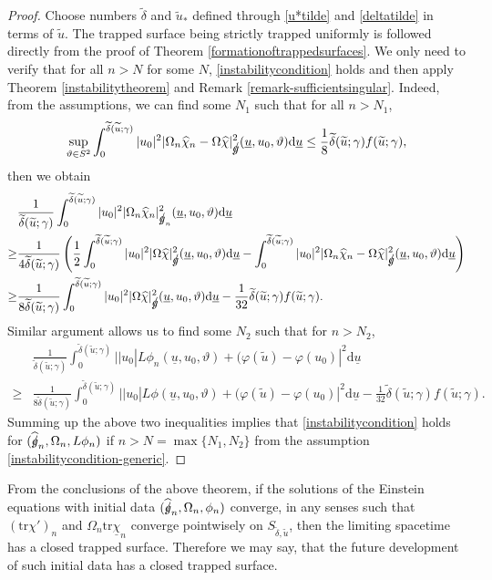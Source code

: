 \documentclass[11pt,reqno]{amsart}
\theoremstyle{definition}
\numberwithin{equation}{section}
\newcommand{\D}{\mathrm{d}}
\newcommand{\tr}{\mathrm{tr}}
\def\chib{\underline{\chi}}
\def\chih{\widehat{\chi}}
\def\tr{\mathrm{tr}}
\def\ub{\underline{u}}
\newcommand{\tdelta}{\widetilde{\delta}}
\newcommand{\tu}{\widetilde{u}}
\def\gs{\mbox{$g \mkern -9mu /$}}
\begin{document}
\begin{proof}
Choose numbers $\tdelta$ and $\tu_*$ defined through \eqref{u*tilde} and \eqref{deltatilde} in terms of $\tu$. The trapped surface being strictly trapped uniformly is followed directly from the proof of Theorem \ref{formationoftrappedsurfaces}. We only need to verify that for all $n>N$ for some $N$, \eqref{instabilitycondition} holds and then apply Theorem \ref{instabilitytheorem} and Remark \ref{remark-sufficientsingular}. Indeed, from the assumptions, we can find some $N_1$ such that for all $n>N_1$,
\begin{align*}
\sup_{\vartheta\in S^2}\int_0^{\tdelta(\tu;\gamma)}|u_0|^2|\Omega_n\chih_n-\Omega\chih|_{\gs}^2(\ub,u_0,\vartheta)\D \ub\le\frac{1}{8}\tdelta(\tu;\gamma)f(\tu;\gamma),
\end{align*}
then we obtain
\begin{align*}
&\frac{1}{\tdelta(\tu;\gamma)}\int_0^{\tdelta(\tu;\gamma)}|u_0|^2|\Omega_n\chih_n|_{\gs_n}^2(\ub,u_0,\vartheta)\D \ub\\
\ge&\frac{1}{4\tdelta(\tu;\gamma)}\left(\frac{1}{2}\int_0^{\tdelta(\tu;\gamma)}|u_0|^2|\Omega\chih|_{\gs}^2(\ub,u_0,\vartheta)\D \ub-\int_0^{\tdelta(\tu;\gamma)}|u_0|^2|\Omega_n\chih_n-\Omega\chih|_{\gs}^2(\ub,u_0,\vartheta)\D \ub\right)\\
\ge&\frac{1}{8\tdelta(\tu;\gamma)}\int_0^{\tdelta(\tu;\gamma)}|u_0|^2|\Omega\chih|_{\gs}^2(\ub,u_0,\vartheta)\D \ub-\frac{1}{32}\tdelta(\tu;\gamma)f(\tu;\gamma).
\end{align*}
Similar argument allows us to find some $N_2$ such that for $n>N_2$,
\begin{align*}
&\frac{1}{\tdelta(\tu;\gamma)}\int_0^{\tdelta(\tu;\gamma)}||u_0|L\phi_n(\ub,u_0,\vartheta)+(\varphi(\tu)-\varphi(u_0)|^2\D \ub\\
\ge&\frac{1}{8\tdelta(\tu;\gamma)}\int_0^{\tdelta(\tu;\gamma)}||u_0|L\phi(\ub,u_0,\vartheta)+(\varphi(\tu)-\varphi(u_0)|^2\D \ub-\frac{1}{32}\tdelta(\tu;\gamma)f(\tu;\gamma).
\end{align*}
Summing up the above two inequalities implies that \eqref{instabilitycondition} holds for $(\widehat{\gs}_n,\Omega_n,L\phi_n)$ if $n>N=\max\{N_1,N_2\}$ from the assumption \eqref{instabilitycondition-generic}. 
\end{proof}
From the conclusions of the above theorem, if the solutions of the Einstein equations with initial data $(\widehat{\gs}_n,\Omega_n,\phi_n)$ converge, in any senses such that $(\tr\chi')_n$ and $\Omega_n\tr\chib_n$ converge pointwisely on $S_{\tdelta,\tu}$, then the limiting spacetime has a closed trapped surface. Therefore we may say, that the future development of such initial data has a closed trapped surface.
\end{document}
